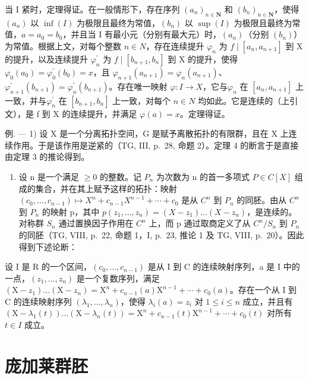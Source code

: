 当 I 紧时，定理得证。在一般情形下，存在序列 \((a_{n})_{n\in\mathbf{N}}\) 和 \((b_{n})_{n\in\mathbf{N}}\)，使得 \((a_{n})\) 以 \(\inf(I)\) 为极限且最终为常值，\((b_{n})\) 以 \(\sup(I)\) 为极限且最终为常值，\(a=a_{0}=b_{0}\)，并且当 I 有最小元（分别有最大元）时，\((a_{n})\)（分别 \((b_{n})\)）为常值。根据上文，对每个整数 \(n\in N\)，存在连续提升 \(\varphi_{n}\) 为 \(f\mid[a_{n},a_{n+1}]\) 到 X 的提升，以及连续提升 \(\varphi_{n}^{\prime}\) 为 \(f\mid[b_{n+1},b_n]\) 到 X 的提升，使得 \(\varphi_{0}(a_{0})=\varphi_{0}^{\prime}(b_{0})=x\)，且 \(\varphi_{n+1}(a_{n+1})=\varphi_{n}(a_{n+1})\)、\(\varphi_{n+1}^{\prime}(b_{n+1})=\varphi_{n}^{\prime}(b_{n+1})\)。存在唯一映射 \(\varphi\colon I\to X\)，它与\(\varphi_{n}\) 在 \([a_{n},a_{n+1}]\) 上一致，并与\(\varphi_{n}^{\prime}\) 在 \([b_{n+1},b_{n}]\) 上一致，对每个 \(n\in N\) 均如此。它是连续的（上引文），是 f 到 X 的连续提升，并满足 \(\varphi(a)=x\)。定理得证。

例. --- 1) 设 X 是一个分离拓扑空间，G 是赋予离散拓扑的有限群，且在 X 上连续作用。于是该作用是逆紧的（TG, III, p.~28, 命题 2）。定理 4 的断言于是直接由定理 3 的推论得到。

\begin{enumerate}
\def\labelenumi{\arabic{enumi})}
\setcounter{enumi}{1}
\tightlist
\item
 设 n 是一个满足 \(\geqslant 0\) 的整数。记 \(P_{n}\) 为次数为 n 的首一多项式 \(P \in C[X]\) 组成的集合，并在其上赋予这样的拓扑：映射 \((c_{0}, \ldots, c_{n-1}) \mapsto X^{n} + c_{n-1}X^{n-1} + \cdots + c_{0}\) 是从 \(C^{n}\) 到 \(P_{n}\) 的同胚。由从 \(C^{n}\) 到 \(P_{n}\) 的映射 p，其中 \(p(z_{1}, \ldots, z_{n}) = (X - z_{1}) \ldots (X - z_{n})\)，是连续的。对称群 \(S_{n}\) 通过置换因子作用在 \(C^{n}\) 上，而 p 通过取商定义了从 \(C^{n}/S_{n}\) 到 \(P_{n}\) 的同胚（TG, VIII, p.~22, 命题 1，I, p.~23, 推论 1 及 TG, VIII, p.~20）。因此得到下述论断：
\end{enumerate}

设 I 是 R 的一个区间，\((c_{0},\ldots,c_{n-1})\) 是从 I 到 C 的连续映射序列，a 是 I 中的一点，\((z_{1},\ldots,z_{n})\) 是一个复数序列，满足 \((\mathrm{X}-z_{1})\ldots(\mathrm{X}-z_{n})=\mathrm{X}^{n}+c_{n-1}(a)\mathrm{X}^{n-1}+\cdots+c_{0}(a)\)。存在一个从 I 到 C 的连续映射序列 \((\lambda_{1},\ldots,\lambda_{n})\)，使得 \(\lambda_{i}(a)=z_{i}\) 对 \(1\leqslant i\leqslant n\) 成立，并且有 \((\mathrm{X}-\lambda_{1}(t))\ldots(\mathrm{X}-\lambda_{n}(t))=\mathrm{X}^{n}+c_{n-1}(t)\mathrm{X}^{n-1}+\cdots+c_{0}(t)\) 对所有 \(t\in I\) 成立。

\section{庞加莱群胚}

